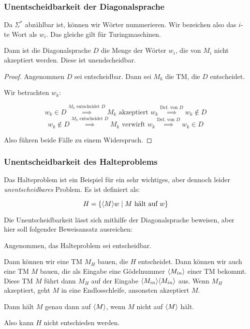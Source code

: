 \documentclass[a4paper,parskip=half*,DIV=7,fontsize=11pt]{scrartcl}
\DeclarePairedDelimiter\goedel{\langle}{\rangle}
\begin{document}
\subsubsection{Unentscheidbarkeit der Diagonalsprache}

Da $\Sigma^\ast$ abzählbar ist, können wir Wörter nummerieren. Wir bezeichen also das $i$-te Wort als $w_i$. Das gleiche gilt für Turingmaschinen.

Dann ist die Diagonalsprache $D$ die Menge der Wörter $w_i$, die von $M_i$ nicht akzeptiert werden. Diese ist unendscheidbar.

\begin{proof}
Angenommen $D$ sei entscheidbar. Dann sei $M_k$ die TM, die $D$ entscheidet.

Wir betrachten $w_k$:

\[w_k \in D \overset{M_k \text{ entscheidet } D}{\implies} M_k \text{ akzeptiert } w_k \overset{\text{Def. von } D}{\implies} w_k \notin D \]
\[w_k \notin D \overset{M_k \text{ entscheidet } D}{\implies} M_k \text{ verwirft } w_k \overset{\text{Def. von } D}{\implies} w_k \in D \]

Also führen beide Fälle zu einem Widerspruch.
\end{proof}

\subsubsection{Unentscheidbarkeit des Halteproblems}
Das Halteproblem ist ein Beispiel für ein sehr wichtiges, aber dennoch leider \emph{unentscheidbares} Problem.  Es ist definiert als:

\[H = \{\goedel{M} w \mid \text{$M$ hält auf $w$}\}\]

Die Unentscheidbarkeit lässt sich mithilfe der Diagonalsprache beweisen, aber hier soll folgender Beweisansatz ausreichen:

Angenommen, das Halteproblem sei entscheidbar. 

Dann können wir eine TM $M_H$ bauen, die $H$ entscheidet. Dann können wir auch eine TM $M$ bauen, die als Eingabe eine Gödelnummer $\goedel{M_{in}}$ einer TM bekommt. Diese TM $M$ führt dann $M_H$ auf der Eingabe $\goedel{M_{in}}\goedel{M_{in}}$ aus. Wenn $M_H$ akzeptiert, geht $M$ in eine Endlosschleife, ansonsten akzeptiert $M$.

Dann hält $M$ genau dann auf $\goedel{M}$, wenn $M$ nicht auf $\goedel{M}$ hält.

Also kann $H$ nicht entschieden werden.
\end{document}
